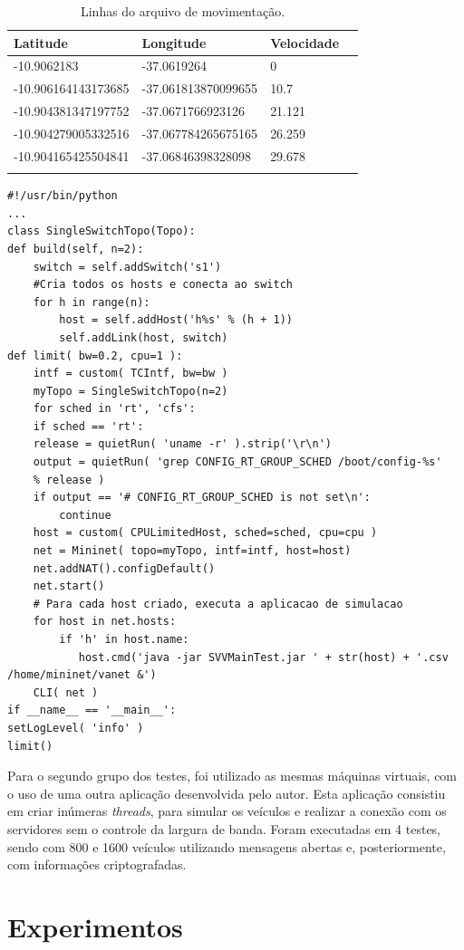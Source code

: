 \documentclass[
	12pt,				%
	oneside,			%
	a4paper,			%
	english,			%
	brazil				%
	]{abntex2ppgsi}
\begin{document}
\begin{longtable}{ p{}  p{}   p{}  p{}} 
	\hline
	\rowcolor[gray]{0.7}
	Latitude	& Longitude	& Velocidade \\ \hline
	-10.9062183	& -37.0619264& 0 \\ \hline
	-10.906164143173685 & -37.061813870099655 & 10.7	\\ \hline	
	-10.904381347197752 & -37.0671766923126 & 21.121 \\ \hline
	-10.904279005332516  & -37.067784265675165 & 26.259 \\ \hline
	-10.904165425504841 & -37.06846398328098 & 29.678 \\ \hline
	\caption{Linhas do arquivo de movimentação.} 
	\label{tab:linhasArquivoMovimentacao}
\end{longtable}
\newpage
\begin{lstlisting}[caption=Script Python para criação dos hosts no mininet., label=src:python]
#!/usr/bin/python
...
class SingleSwitchTopo(Topo):
def build(self, n=2):
    switch = self.addSwitch('s1')
    #Cria todos os hosts e conecta ao switch
    for h in range(n):	
		host = self.addHost('h%s' % (h + 1))
		self.addLink(host, switch)
def limit( bw=0.2, cpu=1 ):
	intf = custom( TCIntf, bw=bw )
	myTopo = SingleSwitchTopo(n=2)
	for sched in 'rt', 'cfs':
	if sched == 'rt':
	release = quietRun( 'uname -r' ).strip('\r\n')
	output = quietRun( 'grep CONFIG_RT_GROUP_SCHED /boot/config-%s'
	% release )
	if output == '# CONFIG_RT_GROUP_SCHED is not set\n':
		continue
	host = custom( CPULimitedHost, sched=sched, cpu=cpu )
	net = Mininet( topo=myTopo, intf=intf, host=host)
	net.addNAT().configDefault()
	net.start()
	# Para cada host criado, executa a aplicacao de simulacao
	for host in net.hosts:
		if 'h' in host.name:
		   host.cmd('java -jar SVVMainTest.jar ' + str(host) + '.csv /home/mininet/vanet &')
	CLI( net )
if __name__ == '__main__':
setLogLevel( 'info' )
limit()
\end{lstlisting}


Para o segundo grupo dos testes, foi utilizado as mesmas máquinas virtuais, com o uso de uma outra aplicação desenvolvida pelo autor. Esta aplicação consistiu em criar inúmeras \textit{threads}, para simular os veículos e realizar a conexão com os servidores sem o controle da largura de banda. Foram executadas em 4 testes, sendo com 800 e 1600 veículos utilizando mensagens abertas e, posteriormente, com informações criptografadas.

\section{Experimentos}
\end{document}
